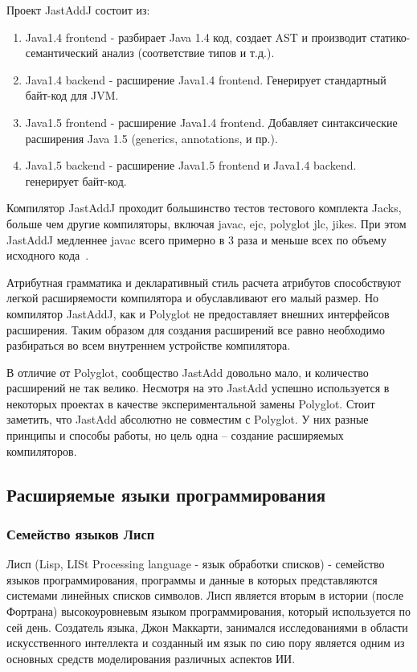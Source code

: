 \documentclass[a4paper,12pt,titlepage]{extarticle}
\begin{document}
Проект JastAddJ состоит из:
\begin{enumerate}
  \item Java1.4 frontend - разбирает Java 1.4 код, создает AST и производит
  статико-семантический анализ (соответствие типов и т.д.).
  \item Java1.4 backend - расширение Java1.4 frontend. Генерирует стандартный байт-код
  для JVM.
  \item Java1.5 frontend - расширение Java1.4 frontend. Добавляет синтаксические
  расширения Java 1.5 (generics, annotations, и пр.).
  \item Java1.5 backend - расширение Java1.5 frontend и Java1.4 backend. генерирует
  байт-код.
\end{enumerate}

Компилятор JastAddJ проходит большинство тестов тестового комплекта Jacks,
больше чем другие компиляторы, включая javac, ejc, polyglot jlc, jikes. При
этом JastAddJ медленнее javac всего примерно в 3 раза и меньше всех по объему
исходного кода~\cite{JastAddJ}.

Атрибутная грамматика и декларативный стиль расчета атрибутов способствуют
легкой расширяемости компилятора и обуславливают его малый размер. Но
компилятор JastAddJ, как и Polyglot не предоставляет внешних интерфейсов
расширения. Таким образом для создания расширений все равно необходимо
разбираться во всем внутреннем устройстве компилятора.

В отличие от Polyglot, сообщество JastAdd довольно мало, и количество
расширений не так велико. Несмотря на это JastAdd успешно используется в
некоторых проектах в качестве экспериментальной замены Polyglot. Стоит
заметить, что JastAdd абсолютно не совместим с Polyglot. У них разные принципы
и способы работы, но цель одна -- создание расширяемых компиляторов.

\subsection{Расширяемые языки программирования}

\subsubsection*{Семейство языков Лисп}
\label{lisp}
Лисп (Lisp, LISt Processing language - язык обработки списков) - семейство
языков программирования, программы и данные в которых представляются системами
линейных списков символов. Лисп является вторым в истории (после Фортрана)
высокоуровневым языком программирования, который используется по сей день.
Создатель языка, Джон Маккарти, занимался исследованиями в области
искусственного интеллекта и созданный им язык по сию пору является одним из
основных средств моделирования различных аспектов ИИ.   
\end{document}
